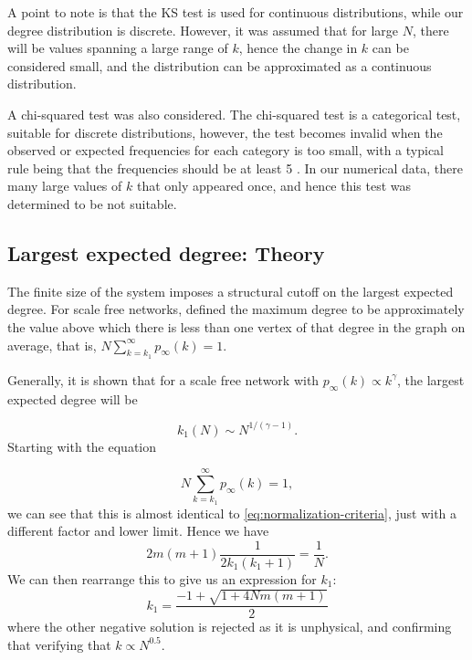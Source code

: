 A point to note is that the KS test is used for continuous distributions, while our degree distribution is discrete. However, it was assumed that for large $N$, there will be values spanning a large range of $k$, hence the change in $k$ can be considered small, and the distribution can be approximated as a continuous distribution. 

A chi-squared test was also considered. The chi-squared test is a categorical test, suitable for discrete distributions, however, the test becomes invalid when the observed or expected frequencies for each category is too small, with a typical rule being that the frequencies should be at least 5 \citep{Lawrence1997}. In our numerical data, there many large values of $k$ that only appeared once, and hence this test was determined to be not suitable. 

\subsection{Largest expected degree: Theory}
The finite size of the system imposes a structural cutoff on the largest expected degree. For scale free networks, \citet{Aiello2001a} defined the maximum degree to be approximately the value above which there is less than one vertex of that degree in the graph on average, that is, $N \sum_{k = k_1}^\infty p_\infty(k) = 1$. 

Generally, it is shown \citep{Boguna2004} that for a scale free network with $p_{\infty}(k) \propto k^{\gamma}$, the largest expected degree will be

\begin{equation}
	k_1(N) \sim N^{1 / (\gamma -1)}.
	\label{eq:largest-expected-degree-research}
\end{equation}
Starting with the equation 

\begin{equation}
	N \sum_{k=k_1}^\infty p_{\infty}(k) = 1, 
	\label{eq:largest-expected-degree-criteria}
\end{equation}
we can see that this is almost identical to \autoref{eq:normalization-criteria}, just with a different factor and lower limit. Hence we have 
\begin{equation}
	2m(m+1) \frac{1}{2k_1(k_1+1)} = \frac{1}{N}.
	\label{eq:largest-expected-degree-derivation}
\end{equation}
We can then rearrange this to give us an expression for $k_1$:
\begin{equation}
	k_1 = \frac{-1 + \sqrt{1 + 4Nm(m+1)}}{2}
	\label{eq:pa-k1-expression}
\end{equation}
where the other negative solution is rejected as it is unphysical, and confirming that verifying that $k \propto N^{0.5}$. 

